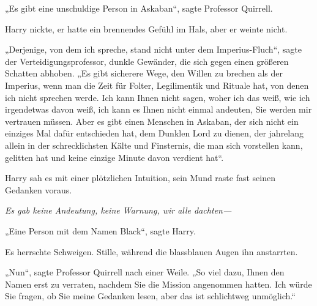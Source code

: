 „Es gibt eine unschuldige Person in Askaban“, sagte Professor Quirrell.

Harry nickte, er hatte ein brennendes Gefühl im Hals, aber er weinte nicht.

„Derjenige, von dem ich spreche, stand nicht unter dem Imperius-Fluch“, sagte der Verteidigungsprofessor, dunkle Gewänder, die sich gegen einen größeren Schatten abhoben. „Es gibt sicherere Wege, den Willen zu brechen als der Imperius, wenn man die Zeit für Folter, Legilimentik und Rituale hat, von denen ich nicht sprechen werde. Ich kann Ihnen nicht sagen, woher ich das weiß, wie ich irgendetwas davon weiß, ich kann es Ihnen nicht einmal andeuten, Sie werden mir vertrauen müssen. Aber es gibt einen Menschen in Askaban, der sich nicht ein einziges Mal dafür entschieden hat, dem Dunklen Lord zu dienen, der jahrelang allein in der schrecklichsten Kälte und Finsternis, die man sich vorstellen kann, gelitten hat und keine einzige Minute davon verdient hat“.

Harry sah es mit einer plötzlichen Intuition, sein Mund raste fast seinen Gedanken voraus.

\emph{Es gab keine Andeutung, keine Warnung, wir alle dachten—}

„Eine Person mit dem Namen Black“, sagte Harry.

Es herrschte Schweigen. Stille, während die blassblauen Augen ihn anstarrten.

„Nun“, sagte Professor Quirrell nach einer Weile. „So viel dazu, Ihnen den Namen erst zu verraten, nachdem Sie die Mission angenommen hatten. Ich würde Sie fragen, ob Sie meine Gedanken lesen, aber das ist schlichtweg unmöglich.“

